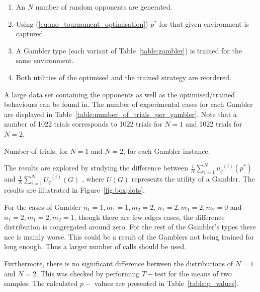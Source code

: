 \documentclass[10pt]{article}
\begin{document}
\begin{enumerate}
    \item An \(N\) number of random opponents are generated.
    \item Using (\ref{eq:mo_tournament_optimisation}) \(p^*\) for that given environment is captured.
    \item A Gambler type (each variant of Table~\ref{table:gambler}) is trained for the same environment.
    \item Both utilities of the optimised and the trained strategy are reordered.
\end{enumerate}

A large data set containing the opponents as well as the optimised/trained behaviours
can be found in. %
The number of experimental cases for each Gambler are displayed in Table~\ref{table:number_of_trials_per_gambler}.
Note that a number of 1022 trials corresponds to 1022 trials for \(N=1\) and 1022
trials for \(N=2\).

\begin{table}[htbp]
    \begin{center}
    
    \caption{Number of trials, for \(N=1\) and \(N=2\), for each Gambler instance.}
    \label{table:number_of_trials_per_gambler}
    \end{center}
\end{table}

The results are explored by studying the difference between 
\(\frac{1}{N} \sum\limits_{i=1} ^ {N} {u_q}^{(i)} (p ^ *)\) and 
\(\frac{1}{N} \sum\limits_{i=1} ^ {N} {U_q}^{(i)} (G)\) ,
where \(U(G)\) represents the utility of a Gambler. The results are illustrated in
Figure~\ref{fig:boxplots}.

For the cases of Gambler \(n_1=1, m_1=1, m_2=2\), \(n_1=2, m_1=2, m_2=0\) and
\(n_1=2, m_1=2, m_2=1\), though there are few edges cases, the difference distribution
is congregated around zero. For the rest of the Gambler's types there nce is mainly worse.
This could be a result of the Gamblers not being trained for long enough. Thus a larger
number of calls should be used. %

Furthermore, there is no significant difference between the distributions of
\(N=1\) and \(N=2\). This was checked by performing \(T-\)test for the means of two
samples. The calculated \(p-\) values are presented in Table~\ref{table:p_values}.
\end{document}
